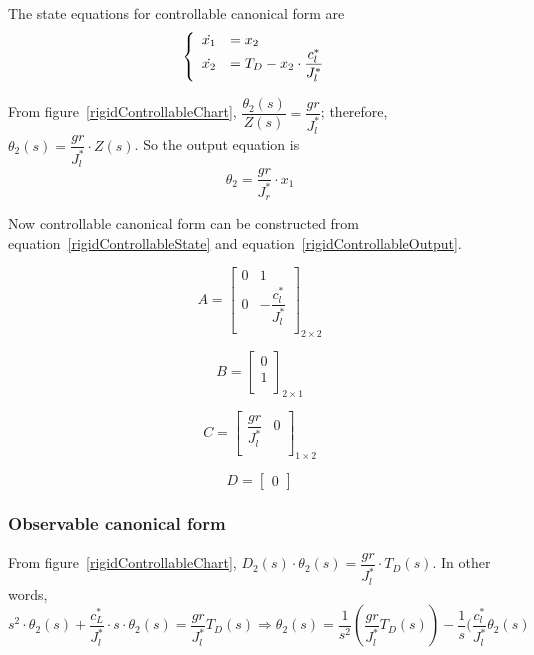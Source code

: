 \documentclass[a4paper, 12pt]{article}
\begin{document}
The state equations for controllable canonical form are
\begin{equation}\label{rigidControllableState}
\left\{ \begin{array}{l l} 
\dot{x_1} &= x_2\\
\dot{x_2} &= T_D - x_2\cdot \dfrac{c_l^*}{J_l^*} \\
\end{array}\right.\ 
\end{equation}

From figure~\ref{rigidControllableChart}, $\dfrac{\theta_2 (s)}{Z(s)} = \dfrac{gr}{J_l^*}$; therefore, $\theta_2(s) = \dfrac{gr}{J_l^*} \cdot Z(s)$. So the output equation is 
\begin{equation}\label{rigidControllableOutput}
\theta_2 = \dfrac{gr}{J_r^*} \cdot x_1
\end{equation}

Now controllable canonical form can be constructed from equation~\ref{rigidControllableState} and equation~\ref{rigidControllableOutput}.

\begin{equation}\label{rigidControllableA}
A = \begin{bmatrix}
0	&	1 \\
0	&	-\dfrac{c_l^*}{J_l^*}	\\
\end{bmatrix}_{2\times 2}
\end{equation}

\begin{equation}\label{rigidControllableB}
B = \begin{bmatrix}
0	\\
1	\\
\end{bmatrix}_{2\times 1}
\end{equation}

\begin{equation}\label{rigidControllableC}
C = \begin{bmatrix}
\dfrac{gr}{J_l^*}	&	0	\\
\end{bmatrix}_{1\times 2}
\end{equation}

\begin{equation}
D = \begin{bmatrix} 0 \end{bmatrix}
\end{equation}


\subsubsection{Observable canonical form}
From figure~\ref{rigidControllableChart}, $D_2(s)\cdot \theta_2(s)= \dfrac{gr}{J_l^*} \cdot T_D(s)$. In other words, 
\begin{equation}\label{rigidObTF}
s^2 \cdot \theta_2(s) + \dfrac{c_L^*}{J_l^*}\cdot s\cdot \theta_2(s) = \dfrac{gr}{J_l^*} T_D(s) \Longrightarrow 
\theta_2(s) =\dfrac{1}{s^2}(\dfrac{gr}{J_l^*} T_D(s)) - \dfrac{1}{s} (\dfrac{c_l^*}{J_l^*} \theta_2(s)
\end{equation}
\end{document}
